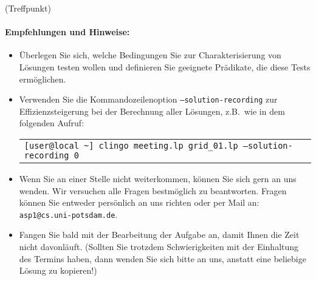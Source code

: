 \documentclass[a4paper,12pt,ngerman]{article}
\begin{document}
\begin{PraktikumsAufgabe}{1}{(Treffpunkt)}


\paragraph{Empfehlungen und Hinweise:}%
\begin{itemize}
\item Überlegen Sie sich, welche Bedingungen Sie zur Charakterisierung von L\"osungen
      testen wollen und definieren Sie geeignete Pr\"adikate, die diese Tests erm\"oglichen.
\item Verwenden Sie die Kommandozeilenoption \texttt{--solution-recording} zur
      Effizienz\-steigerung bei der Berechnung aller L\"osungen, z.B.\ wie in dem folgenden Aufruf:

\begin{tabular}{@{}l}%
\texttt{[user@local \textasciitilde] clingo meeting.lp grid\_01.lp --solution-recording 0}
\end{tabular}
\item Wenn Sie an einer Stelle nicht weiterkommen, können Sie sich gern an uns wenden.
      Wir versuchen alle Fragen bestmöglich zu beantworten.
      Fragen k\"onnen Sie entweder pers\"onlich an uns richten oder per Mail an:
      \texttt{asp1@cs.uni-potsdam.de}.
\item Fangen Sie bald mit der Bearbeitung der Aufgabe an, damit Ihnen die Zeit nicht davonläuft.
      (Sollten Sie trotzdem Schwierigkeiten mit der Einhaltung des Termins
       haben, dann wenden Sie sich bitte an uns, anstatt eine beliebige Lösung
       zu kopieren!)
\end{itemize}

\end{PraktikumsAufgabe}
\end{document}
